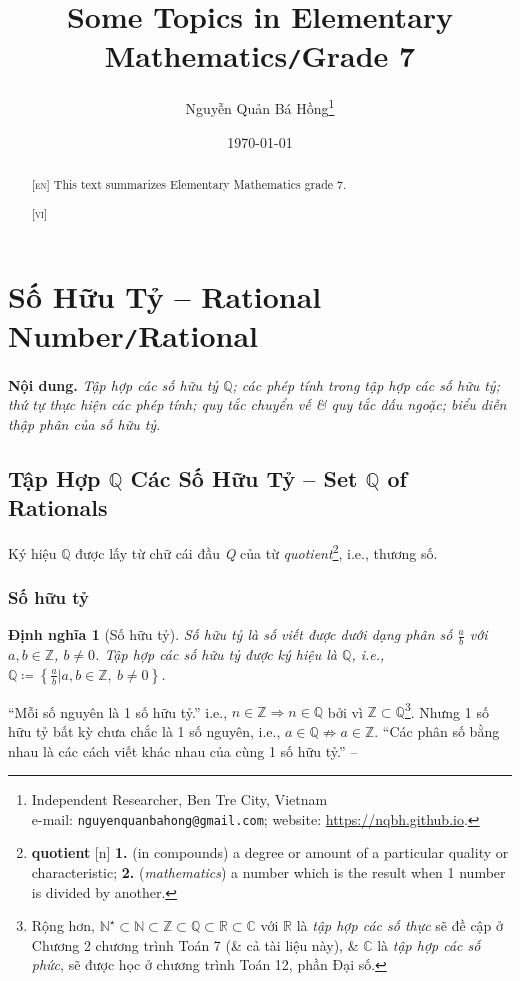 \documentclass{article}
\title{Some Topics in Elementary Mathematics\texttt{/}Grade 7}
\author{Nguyễn Quản Bá Hồng\footnote{Independent Researcher, Ben Tre City, Vietnam\\e-mail: \texttt{nguyenquanbahong@gmail.com}; website: \url{https://nqbh.github.io}.}}
\date{\today}
\numberwithin{equation}{section}
\newtheorem{dinhnghia}{Định nghĩa}[section]
\begin{document}
\maketitle
\begin{abstract}
	\textsc{[en]} This text summarizes Elementary Mathematics grade 7.
	
	\vspace{2mm}
	\textsc{[vi]}
\end{abstract}
\setcounter{secnumdepth}{4}
\setcounter{tocdepth}{3}
\tableofcontents
\newpage


\section{Số Hữu Tỷ -- Rational Number\texttt{/}Rational}
\textbf{Nội dung.} \textit{Tập hợp các số hữu tỷ $\mathbb{Q}$; các phép tính trong tập hợp các số hữu tỷ; thứ tự thực hiện các phép tính; quy tắc chuyển vế \& quy tắc dấu ngoặc; biểu diễn thập phân của số hữu tỷ}.

\subsection{Tập Hợp $\mathbb{Q}$ Các Số Hữu Tỷ -- Set $\mathbb{Q}$ of Rationals}
Ký hiệu $\mathbb{Q}$ được lấy từ chữ cái đầu \textit{Q} của từ \textit{quotient}\footnote{\textbf{quotient} [n] \textbf{1.} (in compounds) a degree or amount of a particular quality or characteristic; \textbf{2.} (\textit{mathematics}) a number which is the result when 1 number is divided by another.}, i.e., thương số.

\subsubsection{Số hữu tỷ}

\begin{dinhnghia}[Số hữu tỷ]
	\emph{Số hữu tỷ} là số viết được dưới dạng phân số $\frac{a}{b}$ với $a,b\in\mathbb{Z}$, $b\ne 0$. \emph{Tập hợp các số hữu tỷ} được ký hiệu là $\mathbb{Q}$, i.e., $\mathbb{Q}\coloneqq\left\{\frac{a}{b}|a,b\in\mathbb{Z},\ b\ne 0\right\}$.
\end{dinhnghia}
``Mỗi số nguyên là 1 số hữu tỷ.'' i.e., $n\in\mathbb{Z}\Rightarrow n\in\mathbb{Q}$ bởi vì $\mathbb{Z}\subset\mathbb{Q}$\footnote{Rộng hơn, $\mathbb{N}^\star\subset\mathbb{N}\subset\mathbb{Z}\subset\mathbb{Q}\subset\mathbb{R}\subset\mathbb{C}$ với $\mathbb{R}$ là \textit{tập hợp các số thực} sẽ đề cập ở Chương 2 chương trình Toán 7 (\& cả tài liệu này), \& $\mathbb{C}$ là \textit{tập hợp các số phức}, sẽ được học ở chương trình Toán 12, phần Đại số.}. Nhưng 1 số hữu tỷ bất kỳ chưa chắc là 1 số nguyên, i.e., $a\in\mathbb{Q}\not\Rightarrow a\in\mathbb{Z}$. ``Các phân số bằng nhau là các cách viết khác nhau của cùng 1 số hữu tỷ.'' -- \cite[p. 6]{SGK_Toan_7_Canh_Dieu_tap_1}
\end{document}
